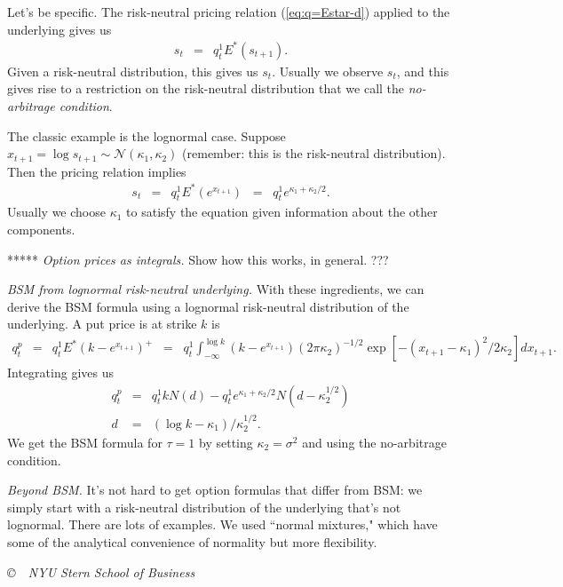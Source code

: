 \documentclass[11pt]{article}
\begin{document}
Let's be specific.
The risk-neutral pricing relation (\ref{eq:q=Estar-d})
applied to the underlying gives us
\begin{eqnarray*}
    s_t &=& q^1_t  E^* (s_{t+1}) .
\end{eqnarray*}
Given a risk-neutral distribution, this gives us $s_t$.
Usually we observe $s_t$, and this gives rise to a restriction
on the risk-neutral distribution that we call the
{\it no-arbitrage condition\/}.

The classic example is the lognormal case.
Suppose $x_{t+1} = \log s_{t+1} \sim \mathcal{N}(\kappa_1, \kappa_2)$
(remember:  this is the risk-neutral distribution).
Then the pricing relation implies
\begin{eqnarray*}
    s_t &=& q^1_t E^* (e^{x_{t+1}}) \;\;=\;\; q^1_t  e^{\kappa_1 + \kappa_2/2} .
\end{eqnarray*}
Usually we choose $\kappa_1$ to satisfy the equation given information
about the other components.

*****
{\it Option prices as integrals.\/}
Show how this works, in general.  ???

{\it BSM from lognormal risk-neutral underlying.\/}
With these ingredients, we can derive the BSM formula using
a lognormal risk-neutral distribution of the underlying.
A put price is at strike $k$ is
\begin{eqnarray*}
    q^p_t &=& q^1_t  E^* (k-e^{x_{t+1}})^+
          \;\;=\;\;  q^1_t  \int_{-\infty}^{\log k}
          (k-e^{x_{t+1}}) (2 \pi \kappa_2)^{-1/2}
          \exp[ - (x_{t+1} - \kappa_1)^2/2 \kappa_2] d x_{t+1} .
\end{eqnarray*}
Integrating gives us
\begin{eqnarray*}
    q^p_t &=& q^1_t k N(d) - q^1_t e^{\kappa_1 + \kappa_2/2} N(d-\kappa_2^{1/2}) \\
    d &=& (\log k - \kappa_1)/\kappa_2^{1/2} .
\end{eqnarray*}
We get the BSM formula for $\tau=1$ by setting $\kappa_2 = \sigma^2$
and using the no-arbitrage condition.


{\it Beyond BSM.\/}
It's not hard to get option formulas that differ from BSM:
we simply start with a risk-neutral distribution of the underlying
that's not lognormal.
There are lots of examples.
We used ``normal mixtures,"
which have some of the analytical convenience of normality
but more flexibility.


\vfill \centerline{\it \copyright \ \number\year \
NYU Stern School of Business}
\end{document}
